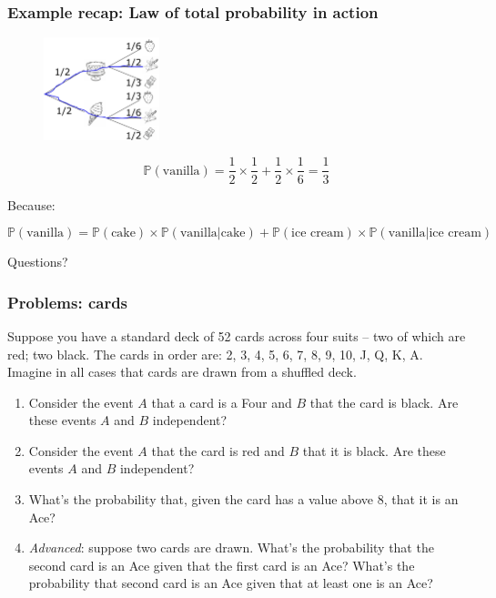 \documentclass{beamer}
\begin{document}
	\begin{frame}
		\frametitle{Example recap: Law of total probability in action}
		
		\begin{figure}[ht]
			\centerline{\includegraphics[width=0.3\textwidth]{./figures/tree-prob-1-vanilla.pdf}}
		\end{figure}
		
		\begin{equation}
			\mathbb{P}(\text{vanilla}) = \frac{1}{2} \times \frac{1}{2} + \frac{1}{2} \times \frac{1}{6} = \frac{1}{3}
		\end{equation}
	
		Because:
		
		\begin{equation}
			\mathbb{P}(\text{vanilla}) = \mathbb{P}(\text{cake}) \times \mathbb{P}(\text{vanilla}|\text{cake})  +  \mathbb{P}(\text{ice cream}) \times \mathbb{P}(\text{vanilla}|\text{ice cream})
		\end{equation}
	
	\end{frame}

	\begin{frame}
		\Large Questions?
	\end{frame}

		\begin{frame}
		\frametitle{Problems: cards}
		
		Suppose you have a standard deck of 52 cards across four suits -- two of which are red; two black. The cards in order are: 2, 3, 4, 5, 6, 7, 8, 9, 10, J, Q, K, A. Imagine in all cases that cards are drawn from a shuffled deck.
		
		\begin{enumerate}
			\item Consider the event $A$ that a card is a Four and $B$ that the card is black. Are these events $A$ and $B$ independent?
			\item Consider the event $A$ that the card is red and $B$ that it is black. Are these events $A$ and $B$ independent?
			\item What's the probability that, given the card has a value above 8, that it is an Ace?
			\item \textit{Advanced}: suppose two cards are drawn. What's the probability that the second card is an Ace given that the first card is an Ace? What's the probability that second card is an Ace given that at least one is an Ace?
		\end{enumerate}
		
	\end{frame}
\end{document}
